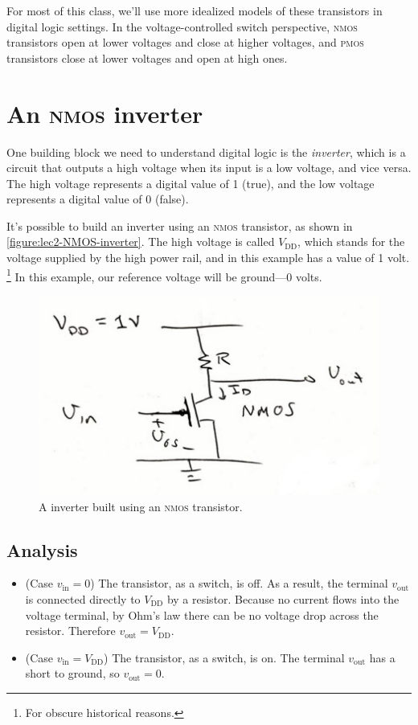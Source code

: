 For most of this class, we'll use more idealized models
of these transistors in digital logic settings.
In the voltage-controlled switch perspective,
\textsc{nmos} transistors open at lower voltages and close at higher voltages,
and \textsc{pmos} transistors close at lower voltages and open at high ones.

\section{An \textsc{nmos} inverter}
One building block we need to understand digital logic is the \emph{inverter},
which is a circuit that outputs a high voltage when its input is a low
voltage, and vice versa.
The high voltage represents a digital value of 1 (true), and the low voltage represents a digital value of 0 (false).

It's possible to build an inverter using an \textsc{nmos} transistor,
as shown in \autoref{figure:lec2-NMOS-inverter}.
The high voltage is called \(V_\text{DD}\), which stands for
the voltage supplied by the high power rail,
and in this example has a value of 1 volt.%
\footnote{For obscure historical reasons.}
In this example, our reference voltage will be ground---0 volts.

\begin{figure}
  \centering
  \includegraphics[width=0.75\linewidth]{figures/NMOS-inverter}
  \caption{A inverter built using an \textsc{nmos} transistor.}
  \label{figure:lec2-NMOS-inverter}
\end{figure}

\subsection{Analysis}
\begin{itemize}
\item
(Case \(v_\text{in} = 0\))
The transistor, as a switch, is off.
As a result, the terminal \(v_\text{out}\)
is connected directly to \(V_\text{DD}\) by a resistor.
Because no current flows into the voltage terminal,
by Ohm's law there can be no voltage drop across the resistor.
Therefore \(v_\text{out} = V_\text{DD}\).

\item
(Case \(v_\text{in} = V_\text{DD}\))
The transistor, as a switch, is on. The terminal \(v_\text{out}\) has a short to ground, so \(v_\text{out} = 0\).
\end{itemize}


